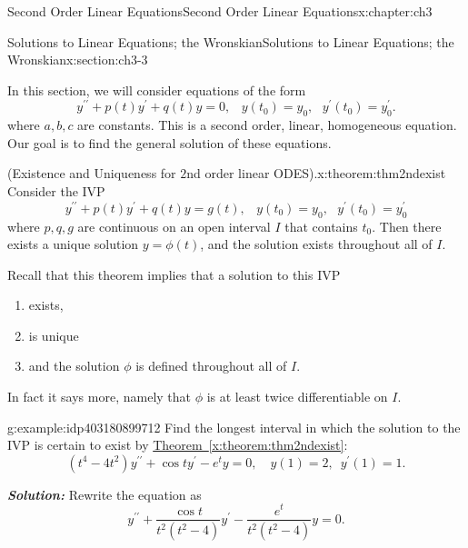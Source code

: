 \documentclass[oneside,10pt,]{book}
\newcommand{\xreffont}{\relax}
\newcommand{\alert}[1]{\textbf{\textit{#1}}}
\numberwithin{equation}{section}
\numberwithin{equation}{section}
\begin{document}
\begin{chapterptx}{Second Order Linear Equations}{}{Second Order Linear Equations}{}{}{x:chapter:ch3}
\typeout{************************************************}
%
\begin{sectionptx}{Solutions to Linear Equations; the Wronskian}{}{Solutions to Linear Equations; the Wronskian}{}{}{x:section:ch3-3}
\begin{introduction}{}%
In this section, we will consider equations of the form%
\begin{equation*}
y^{\prime\prime}+p(t)y^{\prime}+q(t)y=0,\,\,\,\,\,y(t_{0})=y_{0},\,\,\,\,y^{\prime}(t_{0})=y_{0}^{\prime}.
\end{equation*}
where \(a,b,c\) are constants. This is a second order, linear, homogeneous equation. Our goal is to find the general solution of these equations.%
\begin{theorem}{(Existence and Uniqueness for \(2\)nd order linear ODES).}{}{x:theorem:thm2ndexist}%
Consider the IVP%
\begin{equation*}
y^{\prime\prime}+p(t)y^{\prime}+q(t)y=g(t),\,\,\,\,\,y(t_{0})=y_{0},\,\,\,\,y^{\prime}(t_{0})=y_{0}^{\prime}
\end{equation*}
where \(p,q,g\) are continuous on an open interval \(I\) that contains \(t_{0}\). Then there exists a unique solution \(y=\phi(t)\), and the solution exists throughout all of \(I\).%
\end{theorem}
Recall that this theorem implies that a solution to this IVP%
\begin{enumerate}
\item{}exists,%
\item{}is unique%
\item{}and the solution \(\phi\) is defined throughout all of \(I\).%
\end{enumerate}
In fact it says more, namely that \(\phi\) is at least twice differentiable on \(I\).%
\begin{example}{}{g:example:idp403180899712}%
Find the longest interval in which the solution to the IVP is certain to exist by \hyperref[x:theorem:thm2ndexist]{Theorem~{\xreffont\ref{x:theorem:thm2ndexist}}}:%
\begin{equation*}
\left(t^{4}-4t^{2}\right)y^{\prime\prime}+\cos ty^{\prime}-e^{t}y=0,\,\,\,\,\,\,y(1)=2,\,\,\,y^{\prime}(1)=1.
\end{equation*}
%
\par
\alert{Solution:} Rewrite the equation as%
\begin{equation*}
y^{\prime\prime}+\frac{\cos t}{t^{2}\left(t^{2}-4\right)}y^{\prime}-\frac{e^{t}}{t^{2}\left(t^{2}-4\right)}y=0.
\end{equation*}

\end{example}
\end{introduction}
\end{sectionptx}
\end{chapterptx}
\end{document}
